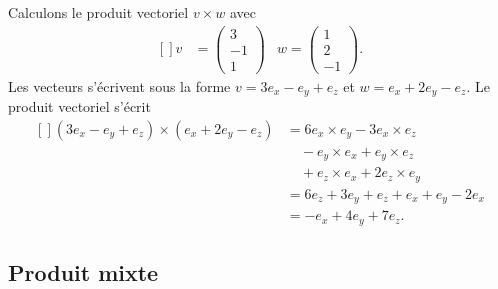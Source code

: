 \begin{example}
	Calculons le produit vectoriel \( v\times w\) avec
	\begin{equation}
		\begin{aligned}[]
			v & =\begin{pmatrix}
				     3  \\
				     -1 \\
				     1
			     \end{pmatrix} & w=\begin{pmatrix}
				                       1 \\
				                       2 \\
				                       -1
			                       \end{pmatrix}.
		\end{aligned}
	\end{equation}
	Les vecteurs s'écrivent sous la forme \( v=3e_x-e_y+e_z\) et \( w=e_x+2e_y-e_z\). Le produit vectoriel s'écrit
	\begin{equation}
		\begin{aligned}[]
			(3e_x-e_y+e_z)\times (e_x+2e_y-e_z) & =6e_x\times e_y-3e_x\times e_z         \\
			                                    & \quad -e_y\times e_x + e_y\times e_z   \\
			                                    & \quad + e_z\times e_x + 2e_z\times e_y \\
			                                    & =6e_z+3e_y+e_z+e_x+e_y-2e_x            \\
			                                    & =-e_x+4e_y+7e_z.
		\end{aligned}
	\end{equation}
\end{example}

\subsection{Produit mixte}

